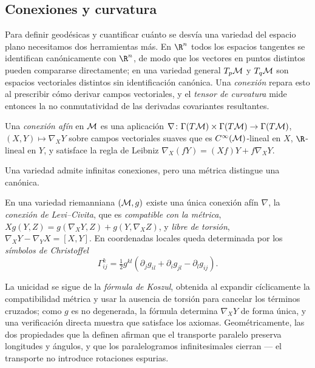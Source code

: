 \subsection{Conexiones y curvatura}
\label{subsec:geo:curvature}

Para definir geod\'esicas y cuantificar cu\'anto se desv\'ia una variedad del
espacio plano necesitamos dos herramientas m\'as. En $\R^n$ todos los espacios
tangentes se identifican can\'onicamente con $\R^n$, de modo que los vectores en
puntos distintos pueden compararse directamente; en una variedad general $T_p\mathcal{M}$
y $T_q\mathcal{M}$ son espacios vectoriales distintos sin identificaci\'on can\'onica.
Una \emph{conexi\'on} repara esto al prescribir c\'omo derivar campos
vectoriales, y el \emph{tensor de curvatura} mide entonces la no conmutatividad
de las derivadas covariantes resultantes.

\begin{definition}[Conexi\'on af\'in]
\label{def:geo:connection}
Una \emph{conexi\'on af\'in} en $\mathcal{M}$ es una aplicaci\'on
$\nabla \colon \Gamma(T\mathcal{M}) \times \Gamma(T\mathcal{M}) \to \Gamma(T\mathcal{M})$,
$(X,Y) \mapsto \nabla_X Y$ sobre campos vectoriales suaves que es
$C^\infty(\mathcal{M})$-lineal en $X$, $\R$-lineal en $Y$, y satisface la regla de
Leibniz $\nabla_X(fY) = (Xf)Y + f\nabla_X Y$.
\end{definition}

Una variedad admite infinitas conexiones, pero una m\'etrica distingue una
can\'onica.

\begin{theorem}
\label{thm:geo:levi-civita}
En una variedad riemanniana $(\mathcal{M}, g)$ existe una \'unica conexi\'on af\'in
$\nabla$, la \emph{conexi\'on de Levi--Civita}, que es \emph{compatible con la
m\'etrica}, $X g(Y,Z) = g(\nabla_X Y, Z) + g(Y, \nabla_X Z)$, y \emph{libre de
torsi\'on}, $\nabla_X Y - \nabla_Y X = [X,Y]$. En coordenadas locales queda
determinada por los \emph{s\'imbolos de Christoffel}
\[
  \Gamma^k_{ij} = \tfrac{1}{2} g^{kl}\!\left(
    \partial_j g_{il} + \partial_i g_{jl} - \partial_l g_{ij}\right).
\]
\end{theorem}

La unicidad se sigue de la \emph{f\'ormula de Koszul}, obtenida al expandir
c\'iclicamente la compatibilidad m\'etrica y usar la ausencia de torsi\'on para
cancelar los t\'erminos cruzados; como $g$ es no degenerada, la f\'ormula
determina $\nabla_X Y$ de forma \'unica, y una verificaci\'on directa muestra que
satisface los axiomas. Geom\'etricamente, las dos propiedades que la definen
afirman que el transporte paralelo preserva longitudes y \'angulos, y que los
paralelogramos infinitesimales cierran --- el transporte no introduce rotaciones
espurias.

